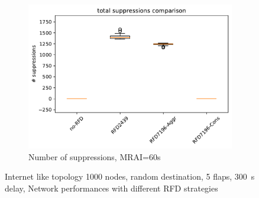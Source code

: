 \begin{figure}[H]
     \hfill
     \begin{subfigure}[b]{0.325\textwidth}
         \centering
         \includegraphics[width=\textwidth]{images/RFD/miceVSelephants/MultiMRAI/60/mice/cisco_1000MRAI60_rfd_comparison_suppressions_boxplot.pdf}
         \caption{\scriptsize Number of suppressions, MRAI=60s}
         \label{fig:1000_RFD_MRAI60_suppressions_mice}
     \end{subfigure}
		\caption{\scriptsize Internet like topology \num{1000} nodes, random destination, \num{5} flaps,
		\SI{300}{\second} delay, Network performances with different \ac{RFD} strategies}
        \label{fig:1000_RFD_MRAI30_mice}
\end{figure}

